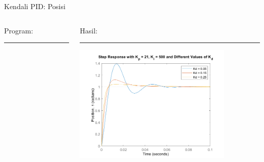 \documentclass[10pt,xcolor={dvipsnames}]{beamer}
\begin{document}
\begin{frame}{Kendali PID: Posisi}
	\begin{columns}[T] %
		\begin{column}{0.48\textwidth}
			Program:
			\color{black}\rule{\linewidth}{4pt}
			
		\end{column}%
		\hfill%
		\begin{column}{0.48\textwidth}
			Hasil:
			\color{blue}\rule{\linewidth}{4pt}
			\begin{center}
				\includegraphics[width=7.5cm]{Matlab/PIDpos.png}
			\end{center}
		\end{column}
	\end{columns}
\end{frame}
\end{document}
